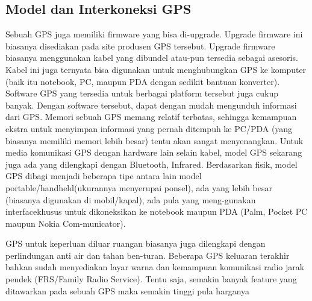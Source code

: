 \subsection{Model dan Interkoneksi GPS}
Sebuah GPS juga memiliki firmware yang bisa di-upgrade. Upgrade firmware ini biasanya disediakan pada site produsen GPS tersebut. Upgrade firmware biasanya menggunakan kabel yang dibundel atau-pun tersedia sebagai asesoris. Kabel ini juga ternyata bisa digunakan untuk menghubungkan GPS ke komputer (baik itu notebook, PC, maupun PDA dengan sedikit bantuan konverter). Software GPS yang tersedia untuk berbagai platform tersebut juga cukup banyak. Dengan software tersebut, dapat dengan mudah mengunduh informasi dari GPS. Memori sebuah GPS memang relatif terbatas, sehingga kemampuan ekstra untuk menyimpan informasi yang pernah ditempuh ke PC/PDA (yang biasanya memiliki memori lebih besar) tentu akan sangat menyenangkan. Untuk media komunikasi GPS dengan hardware lain selain kabel, model GPS sekarang juga ada yang dilengkapi dengan Bluetooth, Infrared.
Berdasarkan fisik, model GPS dibagi menjadi beberapa tipe antara lain model portable/handheld(ukurannya menyerupai ponsel), ada yang lebih besar (biasanya digunakan di mobil/kapal), ada pula yang meng-gunakan interfacekhusus untuk dikoneksikan ke notebook maupun PDA (Palm, Pocket PC maupun Nokia Com-municator). 

GPS untuk keperluan diluar ruangan biasanya juga dilengkapi dengan perlindungan anti air dan tahan ben-turan. Beberapa GPS keluaran terakhir bahkan sudah menyediakan layar warna dan kemampuan komunikasi radio jarak pendek (FRS/Family Radio Service). Tentu saja, semakin banyak feature yang ditawarkan pada sebuah GPS maka semakin tinggi pula harganya

